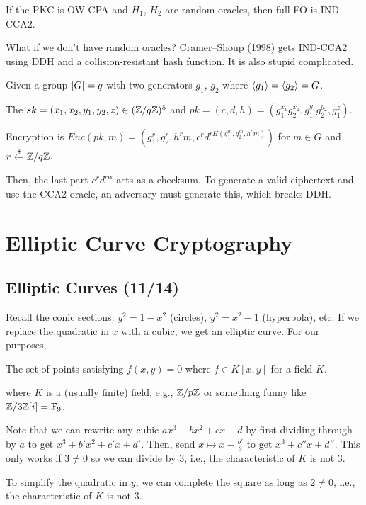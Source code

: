 \documentclass[notes]{agony}
\newcommand{\xgets}{\xleftarrow}
\newcommand{\ndgets}{\xgets{\mathdollar}}
\begin{document}
\begin{theorem}
  If the PKC is OW-CPA and $H_1$, $H_2$ are random oracles,
  then full FO is IND-CCA2.
\end{theorem}

What if we don't have random oracles?
Cramer--Shoup (1998) gets IND-CCA2 using DDH and a collision-resistant hash function.
It is also stupid complicated.

Given a group $\abs{G} = q$ with two generators $g_1$, $g_2$ where $\expval{g_1} = \expval{g_2} = G$.

The $sk = (x_1,x_2,y_1,y_2,z) \in (\mathbb{Z}/q\mathbb{Z})^5$
and $pk = (c,d,h) = (g_1^{x_1}g_2^{x_2}, g_1^{y_1}g_2^{y_2}, g_1^z)$.

Encryption is $Enc(pk, m) = (g_1^r, g_2^r, h^r m, c^r d^{rH(g_1^m, g_2^m, h^r m)})$
for $m \in G$ and $r \ndgets \Z/q\Z$.

Then, the last part $c^r d^{r\alpha}$ acts as a checksum.
To generate a valid ciphertext and use the CCA2 oracle,
an adversary must generate this, which breaks DDH.

\chapter{Elliptic Curve Cryptography}

\section{Elliptic Curves (11/14)}

Recall the conic sections:
$y^2 = 1 - x^2$ (circles), $y^2 = x^2 - 1$ (hyperbola), etc.
If we replace the quadratic in $x$ with a cubic, we get an elliptic curve.
For our purposes,

\begin{defn}[curve]
  The set of points satisfying $f(x,y) = 0$ where $f \in K[x,y]$ for a field $K$.
\end{defn}

where $K$ is a (usually finite) field, e.g., $\mathbb{Z}/p\mathbb{Z}$ or something funny like $\mathbb{Z}/3\mathbb{Z}[i] = \mathbb{F}_9$.

Note that we can rewrite any cubic $ax^3 + bx^2 + cx + d$
by first dividing through by $a$ to get $x^3 + b'x^2 + c'x + d'$.
Then, send $x \mapsto x - \frac{b'}{3}$ to get $x^3 + c''x + d''$.
This only works if $3 \neq 0$ so we can divide by 3,
i.e., the characteristic of $K$ is not 3.

To simplify the quadratic in $y$, we can complete the square as long as
$2 \neq 0$, i.e., the characteristic of $K$ is not 3.
\end{document}
